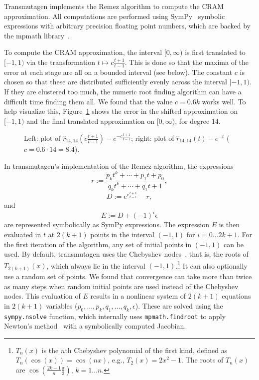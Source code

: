 Transmutagen implements the Remez algorithm to compute the CRAM approximation.
All computations are performed using SymPy~\cite{10.7717/peerj-cs.103}
symbolic expressions with arbitrary precision floating point numbers, which
are backed by the mpmath library~\cite{ationneeded}.

To compute the CRAM approximation, the interval $[0, \infty)$ is first
translated to $[-1, 1)$ via the transformation $t\mapsto c\frac{t+1}{t-1}$.
  This is done so that the maxima of the error at each
stage are all on a bounded interval (see below). The constant $c$ is chosen so
that these are distributed sufficiently evenly across the interval $[-1, 1)$.
If they are clustered too much, the numeric root finding algorithm can have a
difficult time finding them all. We found that the value $c=0.6k$ works well.
To help visualize this, Figure~\ref{fig:cram-plot} shows the error in the
shifted approximation on $[-1, 1)$ and the final translated approximation on
$[0, \infty)$, for degree 14.

\begin{figure}[!ht]
\centering
\resizebox{\textwidth}{!}{}
\caption{Left: plot of $\hat{r}_{14, 14}\left(c\frac{t+1}{t-1}\right) -
  e^{-c\frac{t+1}{t-1}}$; right: plot of $\hat{r}_{14, 14}(t) -
e^{-t}$ ($c=0.6\cdot14=8.4$).}
\label{fig:cram-plot}
\end{figure}

In transmutagen's implementation of the Remez algorithm, the expressions
\begin{equation}
  r := \frac{p_kt^k + \cdots + p_1t + p_0}{q_kt^k + \cdots +
    q_1t + 1},
\end{equation}
\begin{equation}
  D := e^{c\frac{t+1}{t-1}} - r,
\end{equation}
and
\begin{equation}
  E := D + (-1)^i\epsilon
\end{equation}
are represented symbolically as SymPy expressions. The expression $E$ is then
evaluated in $t$ at $2(k + 1)$ points in the interval $(-1, 1)$ for
$i=0\ldots 2k+1$. For the first iteration of the algorithm, any set of initial
points in $(-1, 1)$ can be used. By default, transmutagen uses the Chebyshev
nodes~\cite{ationneeded}, that is, the roots of $T_{2(k +1)}(x)$, which always
lie in the interval $(-1, 1)$.\footnote{$T_n(x)$ is the $n$th Chebyshev
  polynomial of the first kind, defined as $T_n(\cos(x)) = \cos(nx)$, e.g.,
  $T_2(x) = 2x^2 - 1$. The roots of $T_n(x)$ are
  $\cos{\left (\frac{2k - 1}{n}\frac{\pi}{2} \right )},\,k=1\ldots n$.} It can
also optionally use a random set of points. We found that convergence can take
more than twice as many steps when random initial points are used instead of
the Chebyshev nodes.  This evaluation of $E$ results in a
nonlinear system of $2(k+1)$ equations in $2(k+1)$ variables
($p_0,\ldots,p_k,q_1,\ldots,q_k,\epsilon$). These are solved using the
\texttt{sympy.nsolve} function, which internally uses \texttt{mpmath.findroot}
to apply Newton's method~\cite{ationneeded} with a symbolically computed
Jacobian.

